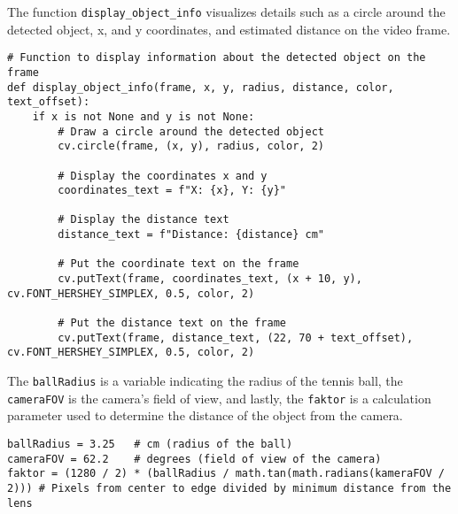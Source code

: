 The function \verb|display_object_info| visualizes \cite{OpenCVDisplay} details such as a circle around the detected object, x, and y coordinates, and estimated distance on the video frame. 
\begin{lstlisting}[language=PythonPlus]
# Function to display information about the detected object on the frame
def display_object_info(frame, x, y, radius, distance, color, text_offset):
    if x is not None and y is not None:
        # Draw a circle around the detected object
        cv.circle(frame, (x, y), radius, color, 2)
        
        # Display the coordinates x and y
        coordinates_text = f"X: {x}, Y: {y}"
        
        # Display the distance text
        distance_text = f"Distance: {distance} cm"
        
        # Put the coordinate text on the frame
        cv.putText(frame, coordinates_text, (x + 10, y), cv.FONT_HERSHEY_SIMPLEX, 0.5, color, 2)
        
        # Put the distance text on the frame
        cv.putText(frame, distance_text, (22, 70 + text_offset), cv.FONT_HERSHEY_SIMPLEX, 0.5, color, 2)
\end{lstlisting}

The \verb|ballRadius| is a variable indicating the radius of the tennis ball, the \verb|cameraFOV| is the camera's field of view, and lastly, the \verb|faktor| is a calculation parameter \cite{CircleParameters} used to determine the distance of the object from the camera. 
\begin{lstlisting}[language=PythonPlus]
ballRadius = 3.25   # cm (radius of the ball)
cameraFOV = 62.2    # degrees (field of view of the camera)
faktor = (1280 / 2) * (ballRadius / math.tan(math.radians(kameraFOV / 2))) # Pixels from center to edge divided by minimum distance from the lens
\end{lstlisting}

